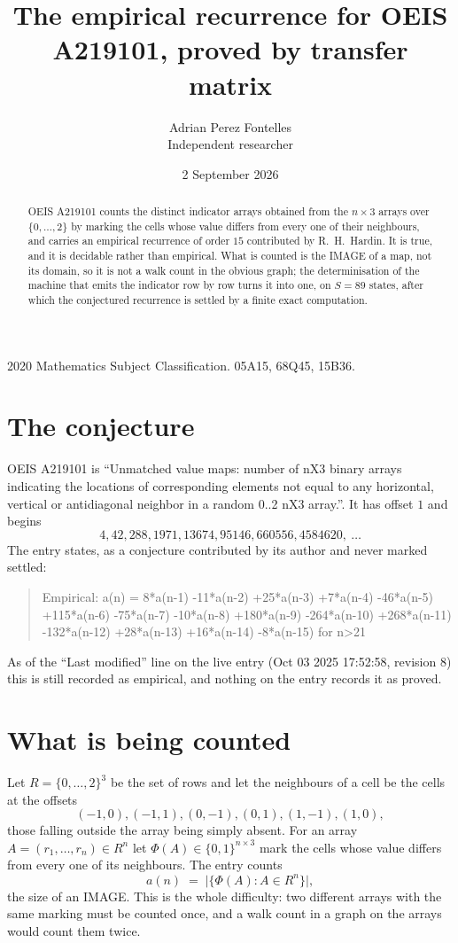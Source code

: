 \documentclass[11pt,a4paper]{article}
\title{The empirical recurrence for OEIS A219101, proved by transfer matrix}
\author{Adrian Perez Fontelles\\ \small Independent researcher}
\date{2 September 2026}
\theoremstyle{plain}
\theoremstyle{definition}
\begin{document}
\maketitle

\begin{abstract}
OEIS A219101 counts the distinct indicator arrays obtained from the $n\times3$ arrays over
$\{0,\dots,2\}$ by marking the cells whose value differs from every one of their neighbours, and carries an
empirical recurrence of order $15$ contributed by R.~H.~Hardin. It is true, and it is
decidable rather than empirical. What is counted is the IMAGE of a map, not its domain, so it
is not a walk count in the obvious graph; the determinisation of the machine that emits the
indicator row by row turns it into one, on $S=89$ states, after which the conjectured
recurrence is settled by a finite exact computation.
\end{abstract}

\noindent\small 2020 Mathematics Subject Classification. 05A15, 68Q45, 15B36.\normalsize

\section{The conjecture}

OEIS A219101 is ``Unmatched value maps: number of nX3 binary arrays indicating the locations of corresponding elements not equal to any horizontal, vertical or antidiagonal neighbor in a random 0..2 nX3 array.''. It has offset $1$ and begins
\[
4, 42, 288, 1971, 13674, 95146, 660556, 4584620,\ \dots
\]
The entry states, as a conjecture contributed by its author and never marked settled:
\begin{quote}
Empirical: a(n) = 8*a(n-1) -11*a(n-2) +25*a(n-3) +7*a(n-4) -46*a(n-5) +115*a(n-6) -75*a(n-7) -10*a(n-8) +180*a(n-9) -264*a(n-10) +268*a(n-11) -132*a(n-12) +28*a(n-13) +16*a(n-14) -8*a(n-15) for n>21
\end{quote}
As of the ``Last modified'' line on the live entry (Oct 03 2025 17:52:58, revision 8) this is still
recorded as empirical, and nothing on the entry records it as proved.

\section{What is being counted}

Let $R=\{0,\dots,2\}^{3}$ be the set of rows and let the neighbours of a cell be the
cells at the offsets
\[
(-1,0), (-1,1), (0,-1), (0,1), (1,-1), (1,0),
\]
those falling outside the array being simply absent. For an array
$A=(r_1,\dots,r_n)\in R^n$ let $\Phi(A)\in\{0,1\}^{n\times3}$ mark the cells whose value
differs from every one of its neighbours. The entry counts
\[
a(n)\;=\;\bigl|\{\Phi(A):A\in R^n\}\bigr| ,
\]
the size of an IMAGE. This is the whole difficulty: two different arrays with the same marking
must be counted once, and a walk count in a graph on the arrays would count them twice.
\end{document}
